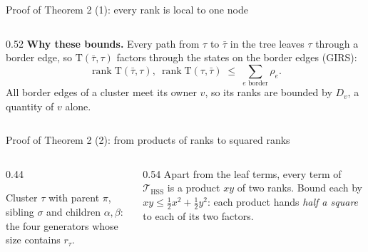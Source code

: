 \documentclass[aspectratio=169,11pt]{beamer}
\begin{document}
\begin{frame}{Proof of Theorem 2 (1): every rank is local to one node}
\begin{columns}[T]
\begin{column}{0.52\textwidth}
\vspace{2mm}
\textbf{Why these bounds.} Every path from $\tau$ to $\bar\tau$ in the tree leaves $\tau$ through a border edge, so
$\mathrm{T}(\bar\tau,\tau)$ factors through the states on the border edges (GIRS):
\[
\operatorname{rank}\mathrm{T}(\bar\tau,\tau),\ \operatorname{rank}\mathrm{T}(\tau,\bar\tau)\;\leq\;\textstyle\sum_{e\text{ border}}\rho_e .
\]
All border edges of a cluster meet its owner $v$, so its ranks are bounded by $D_v$, a quantity of $v$ alone.
\end{column}
\end{columns}
\end{frame}

\begin{frame}{Proof of Theorem 2 (2): from products of ranks to squared ranks}
\begin{columns}[c]
\begin{column}{0.44\textwidth}
\centering
{}

\vspace{2mm}
\scriptsize
Cluster $\tau$ with parent $\pi$, sibling $\sigma$ and children $\alpha,\beta$: the four generators whose size contains
$r_\tau$.
\end{column}
\begin{column}{0.54\textwidth}
\footnotesize
Apart from the leaf terms, every term of $\mathcal{T}_{\mathrm{HSS}}$ is a product $xy$ of two ranks. Bound each by
$xy\leq\frac12x^2+\frac12y^2$: each product hands \emph{half a square} to each of its two factors.


\end{column}
\end{columns}
\end{frame}
\end{document}
